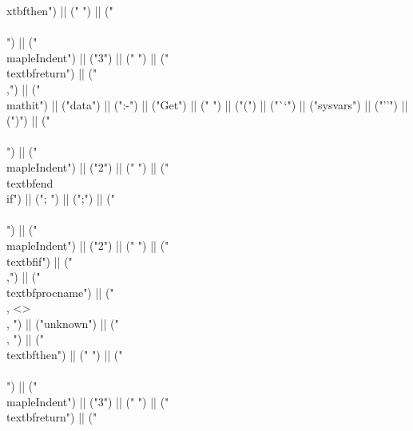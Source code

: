 \documentclass{article}
\begin{document}
\begin{center}
\begin{maplelatex}
{xtbf{then}") || (" ") || ("\\\\\n") || ("\\mapleIndent{") || ("3") || ("} ") || ("\\textbf{return}") || ("\\,") || ("\\mathit{") || ("data") || (":-") || ("Get") || ("} ") || ("(") || ("``") || ("sysvars") || ("''") || (")") || ("\\\\\n") || ("\\mapleIndent{") || ("2") || ("} ") || ("\\textbf{end\\ if}") || ("; ") || (";") || ("\\\\\n") || ("\\mapleIndent{") || ("2") || ("} ") || ("\\textbf{if}") || (" \\,") || ("\\textbf{procname}") || (" \\, <> \\, ") || ("unknown") || (" \\, ") || ("\\textbf{then}") || (" ") || ("\\\\\n") || ("\\mapleIndent{") || ("3") || ("} ") || ("\\textbf{return}") || ("}
\end{maplelatex}
\end{center}
\end{document}
